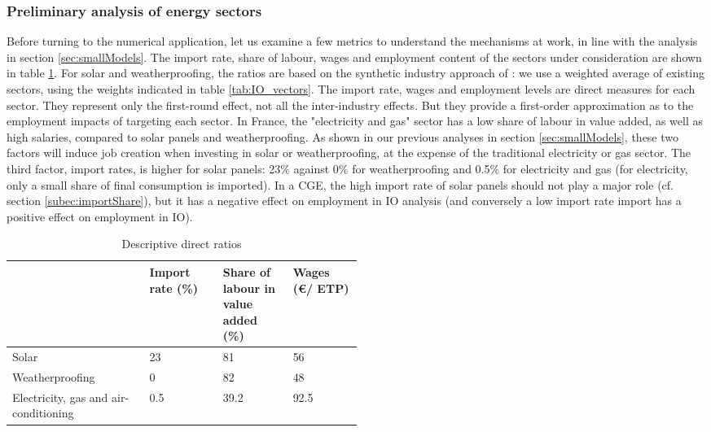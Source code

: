 \subsubsection{Preliminary analysis of energy sectors}
Before turning to the numerical application, let us examine a few metrics to understand the mechanisms at work, in line with the analysis in section \ref{sec:smallModels}. The import rate, share of labour, wages and employment content of the sectors under consideration are shown in table \ref{tab:descriptiveRatios}. 
For solar and weatherproofing, the ratios are based on the synthetic industry approach of \citet{Garrett2017}: we use a weighted average of existing sectors, using the weights indicated in table \ref{tab:IO_vectors}.
The import rate, wages and employment levels are direct measures for each sector. They represent only the first-round effect, not all the inter-industry effects. But they provide a first-order approximation as to the employment impacts of targeting each sector.
In France, the "electricity and gas" sector has a low share of labour in value added, as well as high salaries, compared to solar panels and weatherproofing. As shown in our previous analyses in section \ref{sec:smallModels}, these two factors will induce job creation when investing in solar or weatherproofing, at the expense of the traditional electricity or gas sector.
The third factor, import rates, is higher for solar panels: 23\% against 0\% for weatherproofing and 0.5\% for electricity and gas (for electricity, only a small share of final consumption is imported). In a CGE, the high import rate of solar panels should not play a major role (cf. section \ref{subec:importShare}), but it has a negative effect on employment in IO analysis (and conversely a low import rate import has a positive effect on employment in IO).

\begin{table}[!h]
	\centering
	\caption{Descriptive direct ratios}
	\label{tab:descriptiveRatios}
	\begin{tabular}{p{0.2\linewidth}p{0.1\linewidth}p{0.1\linewidth}p{0.1\linewidth}}
		\toprule
		& Import rate (\%) & Share of labour in value added (\%) & Wages (\euro / ETP)  \\
		\midrule
		Solar & 23 & 81 & 56 \\
		Weatherproofing & 0 & 82 & 48 \\
		Electricity, gas and air-conditioning & 0.5 & 39.2 & 92.5 \\
		\bottomrule
	\end{tabular}
\end{table}


